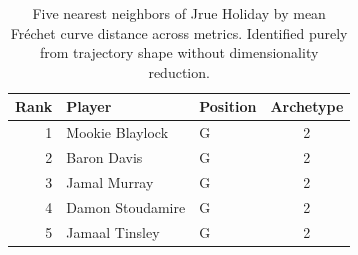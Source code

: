 \begin{table}[htbp]
  \centering\small
  \begin{tabular}{rllc}
    \toprule
    Rank & Player & Position & Archetype \\
    \midrule
    1 & Mookie Blaylock & G & 2 \\
    2 & Baron Davis & G & 2 \\
    3 & Jamal Murray & G & 2 \\
    4 & Damon Stoudamire & G & 2 \\
    5 & Jamaal Tinsley & G & 2 \\
    \bottomrule
  \end{tabular}
  \caption{Five nearest neighbors of Jrue Holiday by mean Fr\'{e}chet curve distance across metrics. Identified purely from trajectory shape without dimensionality reduction.}
  \label{tab:Jrue_Holiday_frechet_curve_neighbors}
\end{table}

